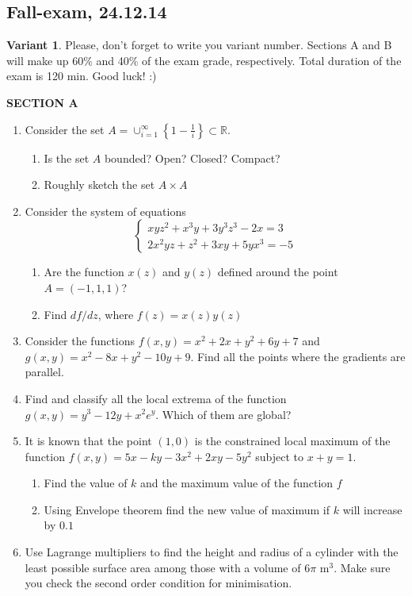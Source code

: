 \documentclass[12pt]{article} %
\theoremstyle{definition} %
\begin{document}
\subsection{Fall-exam, 24.12.14}

\textbf{Variant 1}. Please, don't forget to write you variant number. Sections A and B will make up 60\% and 40\% of the exam grade, respectively. Total duration of the exam is 120 min. Good luck! :)

\vspace{10pt}

\textbf{SECTION A}


\begin{enumerate}
\item Consider the set $A=\cup_{i=1}^{\infty} \left\{ 1-\frac{1}{i} \right\} \subset \mathbb{R}$.
\begin{enumerate}
\item Is the set $A$ bounded? Open? Closed? Compact?
\item Roughly sketch the set $A \times A$
\end{enumerate}

\item Consider the system of equations
\[
\begin{cases}
xyz^2+x^3y+3y^3z^3-2x=3 \\
2x^2yz+z^2+3xy+5yx^3=-5
\end{cases}
\]
\begin{enumerate}
\item Are the function $x(z)$ and $y(z)$ defined around the point $A=(-1,1,1)$?
\item Find $df/dz$, where $f(z)=x(z)y(z)$
\end{enumerate}
\item Consider the functions $f(x,y)=x^2+2x+y^2+6y+7$ and $g(x,y)=x^2-8x+y^2-10y+9$. Find all the points where the gradients are parallel.
\item Find and classify all the local extrema of the function $g(x,y)=y^3 -12y+x^2e^y$. Which of them are global?
\item It is known that the point $(1,0)$ is the constrained local maximum of the function $f(x,y)=5x-ky-3x^2+2xy-5y^2$ subject to $x+y=1$.
\begin{enumerate}
\item Find the value of $k$ and the maximum value of the function $f$
\item Using Envelope theorem find the new value of maximum if $k$ will increase by $0.1$
\end{enumerate}
\item Use Lagrange multipliers to find the height and radius of a cylinder with the least possible
surface area among those with a volume of $6\pi$ m$^3$. Make sure you check the second order
condition for minimisation.
\end{enumerate}
\end{document}
